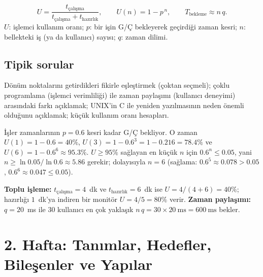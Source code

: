 \documentclass[11pt,a4paper]{article}
\begin{document}
\begin{keyidea}
\[
U = \frac{t_{\text{çalışma}}}{t_{\text{çalışma}} + t_{\text{hazırlık}}}, \qquad
U(n) = 1 - p^{\,n}, \qquad
T_{\text{bekleme}} \approx n\,q .
\]
$U$: işlemci kullanım oranı; $p$: bir işin G/Ç bekleyerek geçirdiği zaman kesri; $n$: bellekteki iş (ya da kullanıcı) sayısı; $q$: zaman dilimi.
\end{keyidea}

\subsection*{Tipik sorular}
Dönüm noktalarını getirdikleri fikirle eşleştirmek (çoktan seçmeli); çoklu programlama (işlemci verimliliği) ile zaman paylaşımı (kullanıcı deneyimi) arasındaki farkı açıklamak; UNIX'in C ile yeniden yazılmasının neden önemli olduğunu açıklamak; küçük kullanım oranı hesapları.

\begin{example}
İşler zamanlarının $p = 0.6$ kesri kadar G/Ç bekliyor. O zaman $U(1) = 1 - 0.6 = 40\%$, $U(3) = 1 - 0.6^{3} = 1 - 0.216 = 78.4\%$ ve $U(6) = 1 - 0.6^{6} \approx 95.3\%$. $U \ge 95\%$ sağlayan en küçük $n$ için $0.6^{n} \le 0.05$, yani $n \ge \ln 0.05 / \ln 0.6 \approx 5.86$ gerekir; dolayısıyla $n = 6$ (sağlama: $0.6^{5} \approx 0.078 > 0.05$, $0.6^{6} \approx 0.047 \le 0.05$).

\textbf{Toplu işleme:} $t_{\text{çalışma}} = 4$~dk ve $t_{\text{hazırlık}} = 6$~dk ise $U = 4/(4+6) = 40\%$; hazırlığı $1$~dk'ya indiren bir monitör $U = 4/5 = 80\%$ verir. \textbf{Zaman paylaşımı:} $q = 20$~ms ile $30$ kullanıcı en çok yaklaşık $n\,q = 30 \times 20\ \text{ms} = 600\ \text{ms}$ bekler.
\end{example}

\section{2. Hafta: Tanımlar, Hedefler, Bileşenler ve Yapılar}
\label{sec:w2}
\end{document}
